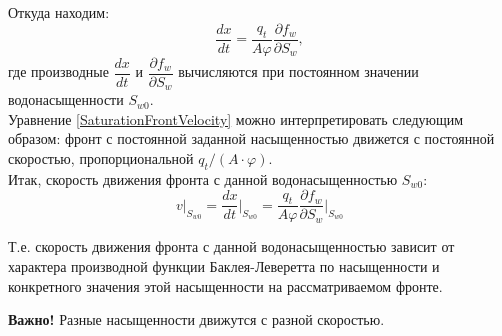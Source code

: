 \documentclass[a4paper,14pt]{extarticle}
\newcommand{\beq}{\begin{equation}}
\newcommand{\eeq}{\end{equation}}
\begin{document}
Откуда находим:
\beq\label{SaturationFrontVelocity}
\frac{dx}{dt}=\frac{q_t}{A\varphi}\frac{\partial f_w}{\partial S_w},
\eeq
где производные $\dfrac{dx}{dt}$ и $\dfrac{\partial f_w}{\partial S_w}$ вычисляются при постоянном значении водонасыщенности $S_{w0}$.
\\

Уравнение \eqref{SaturationFrontVelocity} можно интерпретировать следующим образом: фронт с постоянной заданной насыщенностью движется с постоянной скоростью, пропорциональной $q_t/(A\cdot\varphi)$.
\\

Итак, скорость движения фронта с данной водонасыщенностью $S_{w0}$:
\beq
v|_{S_{w0}}=\frac{dx}{dt}\bigg|_{S_{w0}}=\frac{q_t}{A\varphi}\frac{\partial f_w}{\partial S_w}\bigg|_{S_{w0}}
\eeq

Т.е. скорость движения фронта с данной водонасыщенностью зависит от характера производной функции Баклея-Леверетта по насыщенности и конкретного значения этой насыщенности на рассматриваемом фронте.

\textbf{Важно!} Разные насыщенности движутся с разной скоростью.
\end{document}
